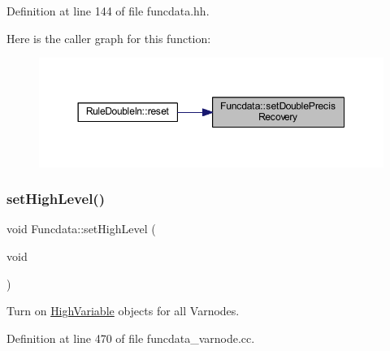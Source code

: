 Definition at line 144 of file funcdata.\+hh.

Here is the caller graph for this function\+:
\nopagebreak
\begin{figure}[H]
\begin{center}
\leavevmode
\includegraphics[width=350pt]{class_funcdata_a23bcddc7a3b959812f9a1660b39cc6ef_icgraph}
\end{center}
\end{figure}
\mbox{\label{class_funcdata_afadeeb585ee8728c427fd6914b8bb7b1}} 
\subsubsection{\texorpdfstring{setHighLevel()}{setHighLevel()}}
{\footnotesize\ttfamily void Funcdata\+::set\+High\+Level (\begin{DoxyParamCaption}\item[{void}]{ }\end{DoxyParamCaption})}



Turn on \mbox{\hyperlink{class_high_variable}{High\+Variable}} objects for all Varnodes. 



Definition at line 470 of file funcdata\+\_\+varnode.\+cc.

